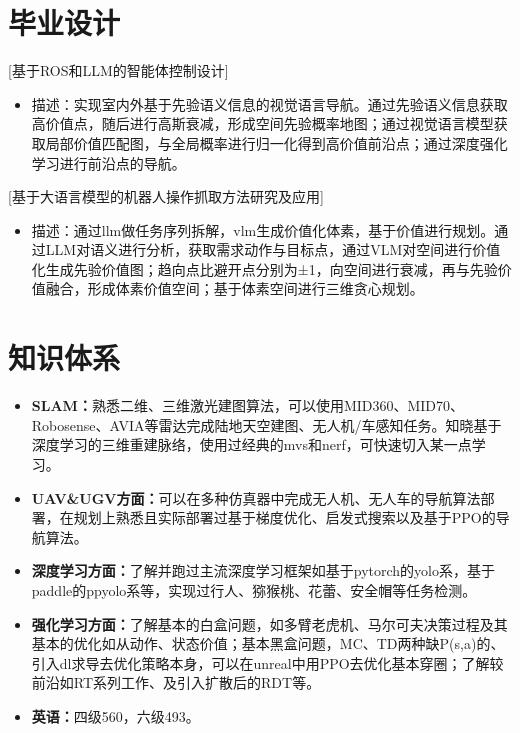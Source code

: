 \documentclass{resume}
\begin{document}
\section{毕业设计}
[\textnormal{基于ROS和LLM的智能体控制设计}]
\begin{itemize}
    \item 描述：实现室内外基于先验语义信息的视觉语言导航。通过先验语义信息获取高价值点，随后进行高斯衰减，形成空间先验概率地图；通过视觉语言模型获取局部价值匹配图，与全局概率进行归一化得到高价值前沿点；通过深度强化学习进行前沿点的导航。

\end{itemize}
[\textnormal{基于大语言模型的机器人操作抓取方法研究及应用}]
\begin{itemize}
    \item 描述：通过llm做任务序列拆解，vlm生成价值化体素，基于价值进行规划。通过LLM对语义进行分析，获取需求动作与目标点，通过VLM对空间进行价值化生成先验价值图；趋向点比避开点分别为±1，向空间进行衰减，再与先验价值融合，形成体素价值空间；基于体素空间进行三维贪心规划。

\end{itemize}


\section{知识体系}
\begin{itemize}
    \item \textbf{SLAM：}熟悉二维、三维激光建图算法，可以使用MID360、MID70、Robosense、AVIA等雷达完成陆地天空建图、无人机/车感知任务。知晓基于深度学习的三维重建脉络，使用过经典的mvs和nerf，可快速切入某一点学习。
    \item \textbf{UAV\&UGV方面：}可以在多种仿真器中完成无人机、无人车的导航算法部署，在规划上熟悉且实际部署过基于梯度优化、启发式搜索以及基于PPO的导航算法。
    \item \textbf{深度学习方面：}了解并跑过主流深度学习框架如基于pytorch的yolo系，基于paddle的ppyolo系等，实现过行人、猕猴桃、花蕾、安全帽等任务检测。
    \item \textbf{强化学习方面：}了解基本的白盒问题，如多臂老虎机、马尔可夫决策过程及其基本的优化如从动作、状态价值；基本黑盒问题，MC、TD两种缺P(s,a)的、引入dl求导去优化策略本身，可以在unreal中用PPO去优化基本穿圈；了解较前沿如RT系列工作、及引入扩散后的RDT等。
    \item \textbf{英语：}四级560，六级493。
\end{itemize}
\end{document}
